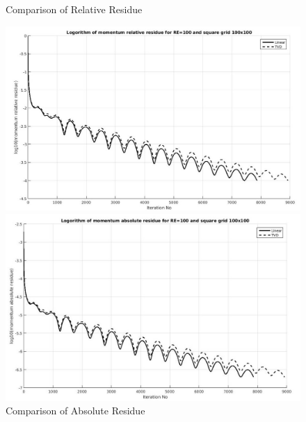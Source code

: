 \documentclass[12pt]{elsarticle}
\begin{document}
	
	\begin{figure}[h]
		\caption{Comparison of Relative Residue}
		\centering\includegraphics[width=1.0\linewidth]{9_rr_linear_re_100_100_100}
		\caption{Comparison of Absolute Residue}
		\centering\includegraphics[width=1.0\linewidth]{10_ar_linear_re_100_100_100}
	\end{figure}
	
\end{document}
